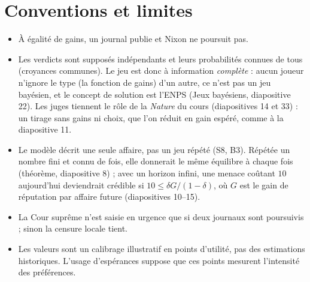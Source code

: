 \documentclass[11pt,a4paper]{article}
\theoremstyle{definition}
\begin{document}
\section{Conventions et limites}
\begin{itemize}[leftmargin=*,itemsep=1pt]
\item À égalité de gains, un journal publie et Nixon ne poursuit pas.
\item Les verdicts sont supposés indépendants et leurs probabilités connues de tous (croyances communes). Le jeu est donc à information \emph{complète} : aucun joueur n'ignore le type (la fonction de gains) d'un autre, ce n'est pas un jeu bayésien, et le concept de solution est l'ENPS (Jeux bayésiens, diapositive 22). Les juges tiennent le rôle de la \emph{Nature} du cours (diapositives 14 et 33) : un tirage sans gains ni choix, que l'on réduit en gain espéré, comme à la diapositive 11.
\item Le modèle décrit une seule affaire, pas un jeu répété (S8, B3). Répétée un nombre fini et connu de fois, elle donnerait le même équilibre à chaque fois (théorème, diapositive 8) ; avec un horizon infini, une menace coûtant $10$ aujourd'hui deviendrait crédible si $10\le \delta G/(1-\delta)$, où $G$ est le gain de réputation par affaire future (diapositives 10--15).
\item La Cour suprême n'est saisie en urgence que si deux journaux sont poursuivis ; sinon la censure locale tient.
\item Les valeurs sont un calibrage illustratif en points d'utilité, pas des estimations historiques. L'usage d'espérances suppose que ces points mesurent l'intensité des préférences.
\end{itemize}
\end{document}
